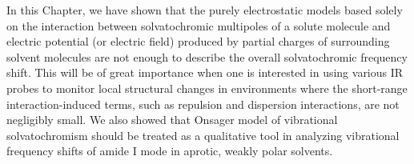 \documentclass[a4paper,titlepage,twoside,fleqn,12pt]{book}
\begin{document}
\begin{refsection}
In this Chapter, we have shown that the purely electrostatic
models based solely on the interaction between
solvatochromic multipoles of a solute molecule and electric
potential (or electric field) produced by partial charges of
surrounding solvent molecules are not enough to describe the
overall solvatochromic frequency shift. This will be of great
importance when one is interested in using various IR probes
to monitor local structural changes in environments where the
short\hyp{}range interaction\hyp{}induced terms, such as repulsion and
dispersion interactions, are not negligibly small.
We also showed that Onsager model of vibrational solvatochromism
should be treated as a qualitative tool in analyzing vibrational
frequency shifts of amide I mode in aprotic, weakly polar solvents.

\printbibliography[heading=subbibintoc,title={References}]
\end{refsection}
\end{document}
